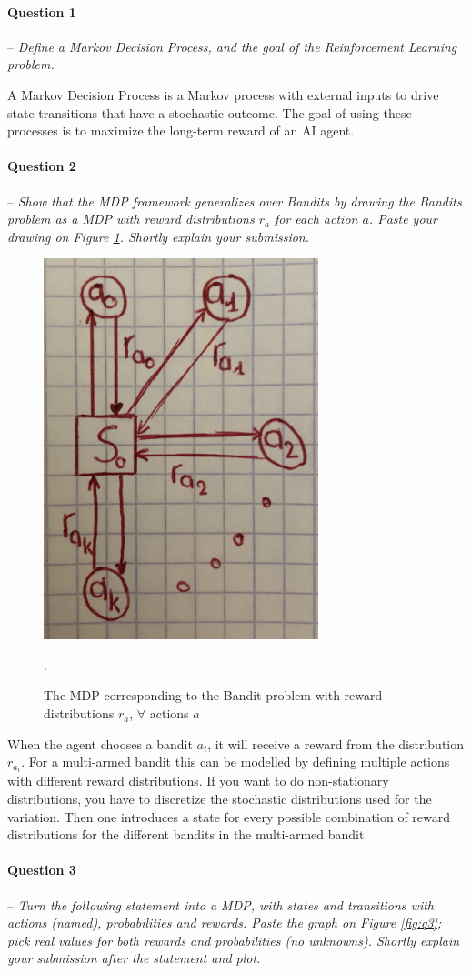 \documentclass[a4paper]{article}
\newcommand{\question}[2]{
\paragraph{Question #1} -- \textit{#2}

}
\begin{document}
		\question{1}{Define a Markov Decision Process, and the goal of the Reinforcement Learning problem.}
			A Markov Decision Process is a Markov process with external inputs to drive state transitions that have a stochastic outcome.
			The goal of using these processes is to maximize the long-term reward of an AI agent.

		\question{2}{Show that the MDP framework generalizes over Bandits by drawing the Bandits problem as a MDP with reward distributions $r_a$ for each action $a$. 
				Paste your drawing on Figure \ref{fig:bandit_mdp}. 
				Shortly explain your submission.}

			\begin{figure}[H]
				\centering
				\includegraphics[width=8cm]{plots/IMG_0257}
				\caption{The MDP corresponding to the Bandit problem with reward distributions $r_a$, $\forall$ actions $a$}.
				\label{fig:bandit_mdp}
			\end{figure}{}
			When the agent chooses a bandit $a_i$, it will receive a reward from the distribution $r_{a_i}$.
			For a multi-armed bandit this can be modelled by defining multiple actions with different reward distributions.
			If you want to do non-stationary distributions, you have to discretize the stochastic distributions used for the variation.
			Then one introduces a state for every possible combination of reward distributions for the different bandits in the multi-armed bandit.


		\question{3}{Turn the following statement into a MDP, with states and transitions with actions (named), probabilities and rewards. 
				Paste the graph on Figure \ref{fig:q3}; pick real values for both rewards and probabilities (no unknowns). 
				Shortly explain your submission after the statement and plot.}
\end{document}
